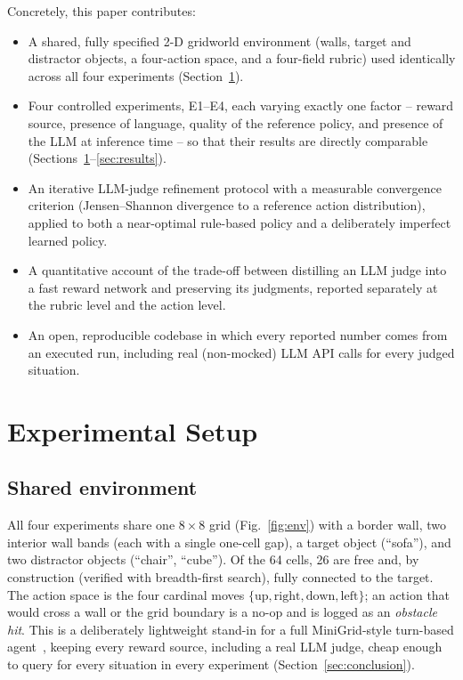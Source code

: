 \documentclass[10pt,twocolumn]{article}
\begin{document}
Concretely, this paper contributes:
\begin{itemize}
  \item A shared, fully specified 2-D gridworld environment (walls,
  target and distractor objects, a four-action space, and a four-field
  rubric) used identically across all four experiments
  (Section~\ref{sec:setup}).
  \item Four controlled experiments, E1--E4, each varying exactly one
  factor -- reward source, presence of language, quality of the
  reference policy, and presence of the LLM at inference time -- so
  that their results are directly comparable
  (Sections~\ref{sec:setup}--\ref{sec:results}).
  \item An iterative LLM-judge refinement protocol with a measurable
  convergence criterion (Jensen--Shannon divergence to a reference
  action distribution), applied to both a near-optimal rule-based policy
  and a deliberately imperfect learned policy.
  \item A quantitative account of the trade-off between distilling an
  LLM judge into a fast reward network and preserving its judgments,
  reported separately at the rubric level and the action level.
  \item An open, reproducible codebase in which every reported number
  comes from an executed run, including real (non-mocked) LLM API calls
  for every judged situation.
\end{itemize}

\section{Experimental Setup}
\label{sec:setup}

\subsection{Shared environment}
\label{subsec:env}

All four experiments share one $8\times8$ grid (Fig.~\ref{fig:env}) with
a border wall, two interior wall bands (each with a single one-cell
gap), a target object (``sofa''), and two distractor objects (``chair'',
``cube''). Of the 64 cells, 26 are free and, by construction (verified
with breadth-first search), fully connected to the target. The action
space is the four cardinal moves $\{\text{up}, \text{right}, \text{down},
\text{left}\}$; an action that would cross a wall or the grid boundary
is a no-op and is logged as an \emph{obstacle hit}. This is a
deliberately lightweight stand-in for a full MiniGrid-style turn-based
agent~\citep{chevalierboisvert2023minigrid}, keeping every reward
source, including a real LLM judge, cheap enough to query for every
situation in every experiment (Section~\ref{sec:conclusion}).
\end{document}

